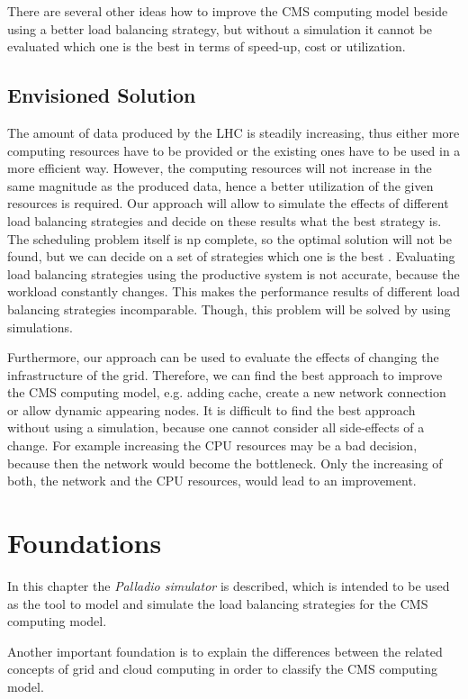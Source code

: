There are several other ideas how to improve the CMS computing model beside using a better load balancing strategy, but without a simulation it cannot be evaluated which one is the best in terms of speed-up, cost or utilization.
\newpage

\section{Envisioned Solution} 
The amount of data produced by the LHC is steadily increasing, thus either more computing resources have to be provided or the existing ones have to be used in a more efficient way.
However, the computing resources will not increase in the same magnitude as the produced data, hence a better utilization of the given resources is required. Our approach will allow to simulate the effects of different load balancing strategies and decide on these results what the best strategy is. The scheduling problem itself is np complete, so the optimal solution will not be found, but we can decide on a set of strategies which one is the best \cite{1698650}. Evaluating load balancing strategies using the productive system is not accurate, because the workload constantly changes. This makes the performance results of different load balancing strategies incomparable. Though, this problem will be solved by using simulations.

Furthermore, our approach can be used to evaluate the effects of changing the infrastructure of the grid. Therefore, we can find the best approach to improve the CMS computing model, e.g. adding cache, create a new network connection or allow dynamic appearing nodes.
It is difficult to find the best approach without using a simulation, because one cannot consider all side-effects of a change. For example increasing the CPU resources may be a bad decision, because then the network would become the bottleneck. Only the increasing of both, the network and the CPU resources, would lead to an improvement.

\chapter {Foundations}
In this chapter the \textit{Palladio simulator} is described, which is intended to be used as the tool to model and simulate the load balancing strategies for the CMS computing model.

Another important foundation is to explain the differences between the related concepts of grid and cloud computing in order to classify the CMS computing model.

